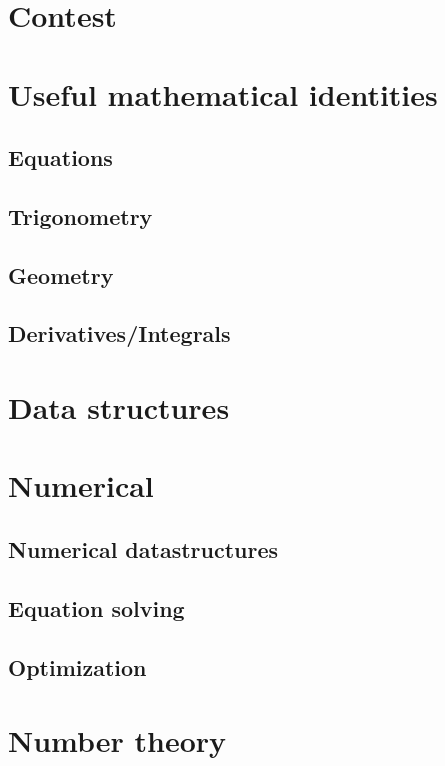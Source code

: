 \documentclass[10pt, a4paper, notitlepage]{report}
\date{2009-02-10}					%
\begin{document}
	\maketitle
	\begin{multicols*}{3}
	\tableofcontents
	\thispagestyle{fancy}
	
	\chapter{Contest}
	
	\chapter{Useful mathematical identities}
	\section{Equations}
	\section{Trigonometry}
	\section{Geometry}
	\section{Derivatives/Integrals}
	
	\chapter{Data structures}
	
	\chapter{Numerical}
	\section{Numerical datastructures}
	\section{Equation solving}
	\section{Optimization}
	
	\chapter{Number theory}

\end{multicols*}
\end{document}
